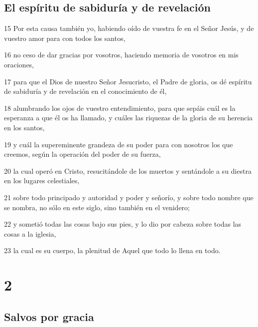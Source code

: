 \section*{El espíritu de sabiduría y de revelación}

\par 15 Por esta causa también yo, habiendo oído de vuestra fe en el Señor Jesús, y de vuestro amor para con todos los santos,
\par 16 no ceso de dar gracias por vosotros, haciendo memoria de vosotros en mis oraciones,
\par 17 para que el Dios de nuestro Señor Jesucristo, el Padre de gloria, os dé espíritu de sabiduría y de revelación en el conocimiento de él,
\par 18 alumbrando los ojos de vuestro entendimiento, para que sepáis cuál es la esperanza a que él os ha llamado, y cuáles las riquezas de la gloria de su herencia en los santos,
\par 19 y cuál la supereminente grandeza de su poder para con nosotros los que creemos, según la operación del poder de su fuerza,
\par 20 la cual operó en Cristo, resucitándole de los muertos y sentándole a su diestra en los lugares celestiales,
\par 21 sobre todo principado y autoridad y poder y señorío, y sobre todo nombre que se nombra, no sólo en este siglo, sino también en el venidero;
\par 22 y sometió todas las cosas bajo sus pies, y lo dio por cabeza sobre todas las cosas a la iglesia,
\par 23 la cual es su cuerpo, la plenitud de Aquel que todo lo llena en todo.

\chapter{2}

\section*{Salvos por gracia}

